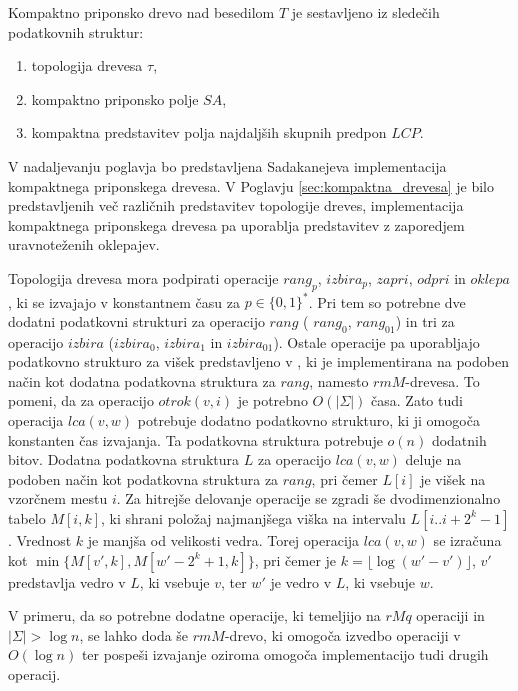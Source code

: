\begin{defi}
    Kompaktno priponsko drevo nad besedilom $T$ je sestavljeno iz sledečih podatkovnih struktur:
    \begin{enumerate}
        \item topologija drevesa $\tau$,
        \item kompaktno priponsko polje $SA$, %
        \item kompaktna predstavitev polja najdaljših skupnih predpon $LCP$.
    \end{enumerate}
\end{defi}

V nadaljevanju poglavja bo predstavljena Sadakanejeva \cite{Sadakane2007} implementacija kompaktnega priponskega drevesa. V Poglavju \ref{sec:kompaktna_drevesa} je bilo predstavljenih več različnih predstavitev topologije dreves, implementacija kompaktnega priponskega drevesa pa uporablja predstavitev z zaporedjem uravnoteženih oklepajev.

Topologija drevesa mora podpirati operacije $rang_p$, $izbira_p$, $zapri$, $odpri$ in $oklepa$, ki se izvajajo v konstantnem času za $p\in\{0,1\} ^*$. Pri tem so potrebne dve dodatni podatkovni strukturi za operacijo $rang$ ( $rang_0$, $rang_{01}$) in tri za operacijo $izbira$ ($izbira_0$, $izbira_1$ in $izbira_{01}$). Ostale operacije pa uporabljajo podatkovno strukturo za višek predstavljeno v \cite{Munro1997}, ki je implementirana na podoben način kot dodatna podatkovna struktura za $rang$, namesto $rmM$-drevesa. To pomeni, da za operacijo $otrok(v,i)$ je potrebno $O(|\Sigma|)$ časa. Zato tudi operacija $lca(v,w)$ potrebuje dodatno podatkovno strukturo, ki ji omogoča konstanten čas izvajanja. Ta podatkovna struktura potrebuje $o(n)$ dodatnih bitov. Dodatna podatkovna struktura $L$ za operacijo $lca(v,w)$ deluje na podoben način kot podatkovna struktura za $rang$, pri čemer $L[i]$ je višek na vzorčnem mestu $i$. Za hitrejše delovanje operacije se zgradi še dvodimenzionalno tabelo $M[i,k]$, ki  shrani položaj najmanjšega viška na intervalu $L[i..i+2^k-1]$. Vrednost $k$ je manjša od velikosti vedra. Torej operacija $lca(v,w)$ se izračuna kot $\min\{M[v',k],M[w'-2^k+1,k]\}$, pri čemer je $k=\lfloor \log{(w'-v')\rfloor}$, $v'$ predstavlja vedro v $L$, ki vsebuje $v$, ter $w'$ je vedro v $L$, ki vsebuje $w$. 

V primeru, da so potrebne dodatne operacije, ki temeljijo na $rMq$ operaciji in $|\Sigma|>\log{n}$, se lahko doda še $rmM$-drevo, ki omogoča izvedbo operaciji v $O(\log{n})$ ter pospeši izvajanje oziroma omogoča implementacijo tudi drugih operacij.

